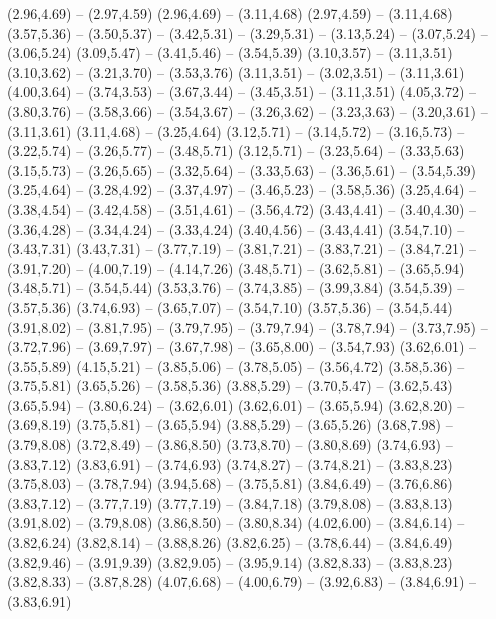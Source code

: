 {  (2.96,4.69) -- (2.97,4.59)
  (2.96,4.69) -- (3.11,4.68)
  (2.97,4.59) -- (3.11,4.68)
  (3.57,5.36) -- (3.50,5.37) -- (3.42,5.31) -- (3.29,5.31) -- (3.13,5.24) -- (3.07,5.24) -- (3.06,5.24)
  (3.09,5.47) -- (3.41,5.46) -- (3.54,5.39)
  (3.10,3.57) -- (3.11,3.51)
  (3.10,3.62) -- (3.21,3.70) -- (3.53,3.76)
  (3.11,3.51) -- (3.02,3.51) -- (3.11,3.61)
  (4.00,3.64) -- (3.74,3.53) -- (3.67,3.44) -- (3.45,3.51) -- (3.11,3.51)
  (4.05,3.72) -- (3.80,3.76) -- (3.58,3.66) -- (3.54,3.67) -- (3.26,3.62) -- (3.23,3.63) -- (3.20,3.61) -- (3.11,3.61)
  (3.11,4.68) -- (3.25,4.64)
  (3.12,5.71) -- (3.14,5.72) -- (3.16,5.73) -- (3.22,5.74) -- (3.26,5.77) -- (3.48,5.71)
  (3.12,5.71) -- (3.23,5.64) -- (3.33,5.63)
  (3.15,5.73) -- (3.26,5.65) -- (3.32,5.64) -- (3.33,5.63) -- (3.36,5.61) -- (3.54,5.39)
  (3.25,4.64) -- (3.28,4.92) -- (3.37,4.97) -- (3.46,5.23) -- (3.58,5.36)
  (3.25,4.64) -- (3.38,4.54) -- (3.42,4.58) -- (3.51,4.61) -- (3.56,4.72)
  (3.43,4.41) -- (3.40,4.30) -- (3.36,4.28) -- (3.34,4.24) -- (3.33,4.24)
  (3.40,4.56) -- (3.43,4.41)
  (3.54,7.10) -- (3.43,7.31)
  (3.43,7.31) -- (3.77,7.19) -- (3.81,7.21) -- (3.83,7.21) -- (3.84,7.21) -- (3.91,7.20) -- (4.00,7.19) -- (4.14,7.26)
  (3.48,5.71) -- (3.62,5.81) -- (3.65,5.94)
  (3.48,5.71) -- (3.54,5.44)
  (3.53,3.76) -- (3.74,3.85) -- (3.99,3.84)
  (3.54,5.39) -- (3.57,5.36)
  (3.74,6.93) -- (3.65,7.07) -- (3.54,7.10)
  (3.57,5.36) -- (3.54,5.44)
  (3.91,8.02) -- (3.81,7.95) -- (3.79,7.95) -- (3.79,7.94) -- (3.78,7.94) -- (3.73,7.95) -- (3.72,7.96) -- (3.69,7.97) -- (3.67,7.98) -- (3.65,8.00) -- (3.54,7.93)
  (3.62,6.01) -- (3.55,5.89)
  (4.15,5.21) -- (3.85,5.06) -- (3.78,5.05) -- (3.56,4.72)
  (3.58,5.36) -- (3.75,5.81)
  (3.65,5.26) -- (3.58,5.36)
  (3.88,5.29) -- (3.70,5.47) -- (3.62,5.43)
  (3.65,5.94) -- (3.80,6.24) -- (3.62,6.01)
  (3.62,6.01) -- (3.65,5.94)
  (3.62,8.20) -- (3.69,8.19)
  (3.75,5.81) -- (3.65,5.94)
  (3.88,5.29) -- (3.65,5.26)
  (3.68,7.98) -- (3.79,8.08)
  (3.72,8.49) -- (3.86,8.50)
  (3.73,8.70) -- (3.80,8.69)
  (3.74,6.93) -- (3.83,7.12)
  (3.83,6.91) -- (3.74,6.93)
  (3.74,8.27) -- (3.74,8.21) -- (3.83,8.23)
  (3.75,8.03) -- (3.78,7.94)
  (3.94,5.68) -- (3.75,5.81)
  (3.84,6.49) -- (3.76,6.86)
  (3.83,7.12) -- (3.77,7.19)
  (3.77,7.19) -- (3.84,7.18)
  (3.79,8.08) -- (3.83,8.13)
  (3.91,8.02) -- (3.79,8.08)
  (3.86,8.50) -- (3.80,8.34)
  (4.02,6.00) -- (3.84,6.14) -- (3.82,6.24)
  (3.82,8.14) -- (3.88,8.26)
  (3.82,6.25) -- (3.78,6.44) -- (3.84,6.49)
  (3.82,9.46) -- (3.91,9.39)
  (3.82,9.05) -- (3.95,9.14)
  (3.82,8.33) -- (3.83,8.23)
  (3.82,8.33) -- (3.87,8.28)
  (4.07,6.68) -- (4.00,6.79) -- (3.92,6.83) -- (3.84,6.91) -- (3.83,6.91)
}
